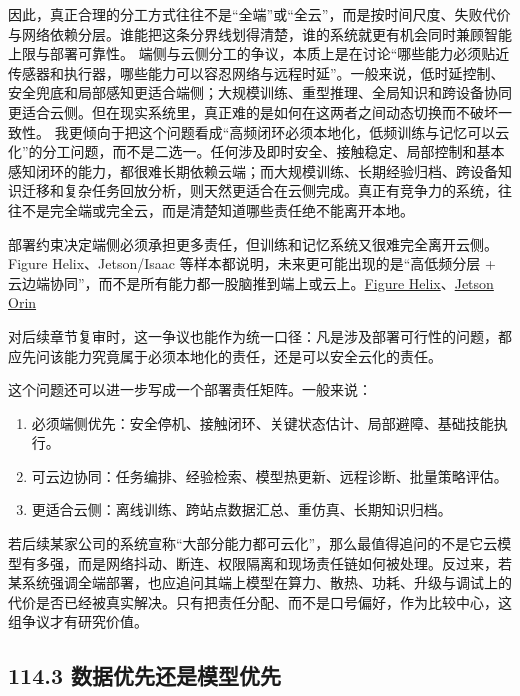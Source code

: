 因此，真正合理的分工方式往往不是“全端”或“全云”，而是按时间尺度、失败代价与网络依赖分层。谁能把这条分界线划得清楚，谁的系统就更有机会同时兼顾智能上限与部署可靠性。 端侧与云侧分工的争议，本质上是在讨论“哪些能力必须贴近传感器和执行器，哪些能力可以容忍网络与远程时延”。一般来说，低时延控制、安全兜底和局部感知更适合端侧；大规模训练、重型推理、全局知识和跨设备协同更适合云侧。但在现实系统里，真正难的是如何在这两者之间动态切换而不破坏一致性。 我更倾向于把这个问题看成“高频闭环必须本地化，低频训练与记忆可以云化”的分工问题，而不是二选一。任何涉及即时安全、接触稳定、局部控制和基本感知闭环的能力，都很难长期依赖云端；而大规模训练、长期经验归档、跨设备知识迁移和复杂任务回放分析，则天然更适合在云侧完成。真正有竞争力的系统，往往不是完全端或完全云，而是清楚知道哪些责任绝不能离开本地。

部署约束决定端侧必须承担更多责任，但训练和记忆系统又很难完全离开云侧。Figure Helix、Jetson/Isaac 等样本都说明，未来更可能出现的是“高低频分层 + 云边端协同”，而不是所有能力都一股脑推到端上或云上。\href{https://www.figure.ai/news/helix}{Figure Helix}、\href{https://www.nvidia.com/en-us/autonomous-machines/embedded-systems/jetson-orin/}{Jetson Orin}

对后续章节复审时，这一争议也能作为统一口径：凡是涉及部署可行性的问题，都应先问该能力究竟属于必须本地化的责任，还是可以安全云化的责任。

这个问题还可以进一步写成一个部署责任矩阵。一般来说：

\begin{enumerate}
\item 必须端侧优先：安全停机、接触闭环、关键状态估计、局部避障、基础技能执行。
\item 可云边协同：任务编排、经验检索、模型热更新、远程诊断、批量策略评估。
\item 更适合云侧：离线训练、跨站点数据汇总、重仿真、长期知识归档。
\end{enumerate}

若后续某家公司的系统宣称“大部分能力都可云化”，那么最值得追问的不是它云模型有多强，而是网络抖动、断连、权限隔离和现场责任链如何被处理。反过来，若某系统强调全端部署，也应追问其端上模型在算力、散热、功耗、升级与调试上的代价是否已经被真实解决。只有把责任分配、而不是口号偏好，作为比较中心，这组争议才有研究价值。

\subsection*{114.3 数据优先还是模型优先}


